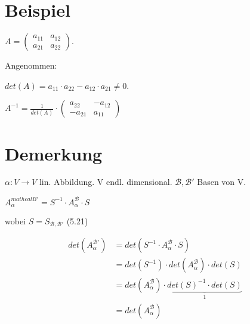 \documentclass[a4paper, openany]{book}
\begin{document}
        \section{Beispiel}

        $A = \begin{pmatrix}a_{11} & a_{12} \\ a_{21} & a_{22} \end{pmatrix}$.

        \par \medskip

        Angenommen:

        $det(A) = a_{11} \cdot a_{22} - a_{12} \cdot a_{21} \neq 0$.

        \begin{center}
          $A^{-1} = \frac{1}{det(A)} \cdot \begin{pmatrix}a_{22} & - a_{12} \\ - a_{21} & a_{11} \end{pmatrix}$
        \end{center}

        \section{Demerkung}

        $\alpha : V \rightarrow V $ lin. Abbildung. V endl. dimensional. $\mathcal{B, B'}$ Basen von V.

        \par \medskip

        \par \medskip

        \begin{center}
          $A_{\alpha}^{mathcal{B'}} = S^{-1} \cdot A_{\alpha}^{\mathcal{B}} \cdot S$
        \end{center}

        wobei $S = S_{\mathcal{B, B'}}$ (5.21)

        \par \medskip

        \par \medskip

        \begin{align*}
          det(A_{\alpha}^{\mathcal{B'}}) & = det(S^{-1} \cdot A_{\alpha}^{\mathcal{B}} \cdot S)  \\
                                         & = det(S^{-1}) \cdot det(A_{\alpha}^{\mathcal{B}}) \cdot det(S) \\
                                         & = det(A_{\alpha}^{\mathcal{B}}) \cdot \underbrace{det(S)^{-1} \cdot det(S)}_{1} \\
                                         & = det(A_{\alpha}^{\mathcal{B}})
        \end{align*}
\end{document}
